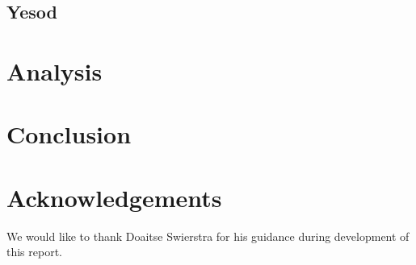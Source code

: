 \documentclass[twocolumn,9pt,a4paper]{article}
\begin{document}
		\subsection{Yesod}\label{yesod}
		
	
	\section{Analysis}\label{comp}
	
		
	
	\section{Conclusion}\label{conclusion}
	
		
	
    \section{Acknowledgements}
    We would like to thank Doaitse Swierstra for his guidance during development of this report.
	
	
\end{document}
